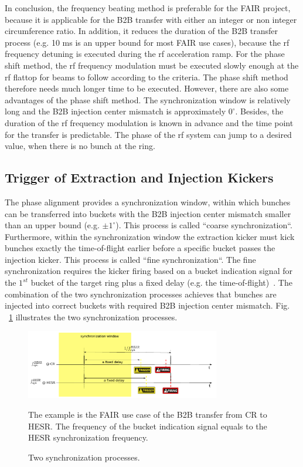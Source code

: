 In conclusion, the frequency beating method is preferable for the FAIR project, because it is applicable for the B2B transfer with either an integer or non integer circumference ratio. In addition, it reduces the duration of the B2B transfer process (e.g. 10 ms is an upper bound for most FAIR use cases), because the rf frequency detuning is executed during the rf acceleration ramp. For the phase shift method, the rf frequency modulation must be executed slowly enough at the rf flattop for beams to follow according to the criteria. The phase shift method therefore needs much longer time to be executed. However, there are also some advantages of the phase shift method. The synchronization window is relatively long and the B2B injection center mismatch is approximately $0^\circ$. Besides, the duration of the rf frequency modulation is known in advance and the time point for the transfer is predictable. The phase of the rf system can jump to a desired value, when there is no bunch at the ring.  
\subsection{Trigger of Extraction and Injection Kickers}
The phase alignment provides a synchronization window, within which bunches can be transferred into buckets with the B2B injection center mismatch smaller than an upper bound (e.g. $\pm1^\circ$). This process is called ``coarse synchronization``. Furthermore, within the synchronization window the extraction kicker must kick bunches exactly the time-of-flight earlier before a specific bucket passes the injection kicker. This process is called ``fine synchronization``. The fine synchronization requires the kicker firing based on a bucket indication signal for the $1^\mathit{st}$ bucket of the target ring plus a fixed delay (e.g. the time-of-flight)~\cite{bai_f-tc-c-05_2016}. The combination of the two synchronization processes achieves that bunches are injected into correct buckets with required B2B injection center mismatch. Fig. ~\ref{ext_inj_kicker1} illustrates the two synchronization processes.
\begin{figure}[!htb]
   \centering   
   \includegraphics*[width=85mm]{ext_inj_ill2.pdf}
   \caption{Two synchronization processes.}
{\small{The example is the FAIR use case of the B2B transfer from CR to HESR. The frequency of the bucket indication signal equals to the HESR synchronization frequency.}}
   \label{ext_inj_kicker1}
\end{figure}

